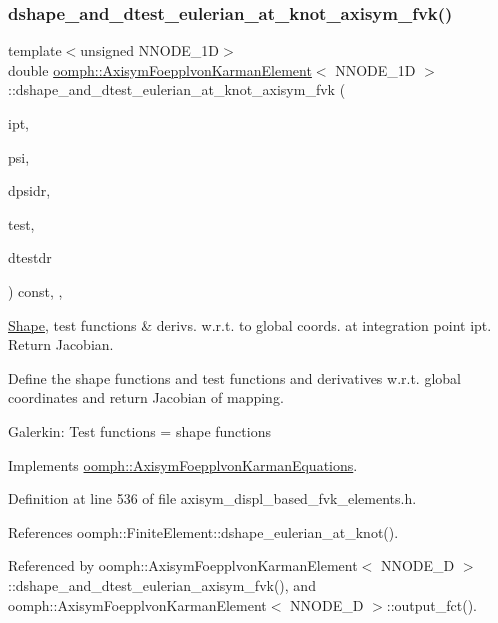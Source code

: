 \subsubsection{\texorpdfstring{dshape\+\_\+and\+\_\+dtest\+\_\+eulerian\+\_\+at\+\_\+knot\+\_\+axisym\+\_\+fvk()}{dshape\_and\_dtest\_eulerian\_at\_knot\_axisym\_fvk()}\hspace{0.1cm}{\footnotesize\ttfamily [2/2]}}
{\footnotesize\ttfamily template$<$unsigned N\+N\+O\+D\+E\+\_\+1D$>$ \\
double \hyperlink{classoomph_1_1AxisymFoepplvonKarmanElement}{oomph\+::\+Axisym\+Foepplvon\+Karman\+Element}$<$ N\+N\+O\+D\+E\+\_\+1D $>$\+::dshape\+\_\+and\+\_\+dtest\+\_\+eulerian\+\_\+at\+\_\+knot\+\_\+axisym\+\_\+fvk (\begin{DoxyParamCaption}\item[{const unsigned \&}]{ipt,  }\item[{\hyperlink{classoomph_1_1Shape}{Shape} \&}]{psi,  }\item[{\hyperlink{classoomph_1_1DShape}{D\+Shape} \&}]{dpsidr,  }\item[{\hyperlink{classoomph_1_1Shape}{Shape} \&}]{test,  }\item[{\hyperlink{classoomph_1_1DShape}{D\+Shape} \&}]{dtestdr }\end{DoxyParamCaption}) const\hspace{0.3cm}{\ttfamily [inline]}, {\ttfamily [protected]}, {\ttfamily [virtual]}}



\hyperlink{classoomph_1_1Shape}{Shape}, test functions \& derivs. w.\+r.\+t. to global coords. at integration point ipt. Return Jacobian. 

Define the shape functions and test functions and derivatives w.\+r.\+t. global coordinates and return Jacobian of mapping.

Galerkin\+: Test functions = shape functions 

Implements \hyperlink{classoomph_1_1AxisymFoepplvonKarmanEquations_a456a9c27c326d6d1e55e3ab822ac1a5f}{oomph\+::\+Axisym\+Foepplvon\+Karman\+Equations}.



Definition at line 536 of file axisym\+\_\+displ\+\_\+based\+\_\+fvk\+\_\+elements.\+h.



References oomph\+::\+Finite\+Element\+::dshape\+\_\+eulerian\+\_\+at\+\_\+knot().



Referenced by oomph\+::\+Axisym\+Foepplvon\+Karman\+Element$<$ N\+N\+O\+D\+E\+\_\+D $>$\+::dshape\+\_\+and\+\_\+dtest\+\_\+eulerian\+\_\+axisym\+\_\+fvk(), and oomph\+::\+Axisym\+Foepplvon\+Karman\+Element$<$ N\+N\+O\+D\+E\+\_\+D $>$\+::output\+\_\+fct().

